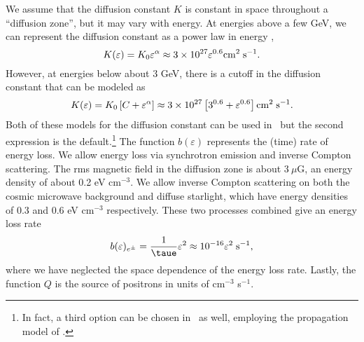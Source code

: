 We assume that the diffusion constant $K$ is constant in space throughout a
``diffusion zone'', but it may vary with energy.  At energies above a few GeV,
we can represent the diffusion constant as a power law in energy \cite{wlg},
\begin{equation}
   K(\varepsilon)=K_0\varepsilon^\alpha\approx
   3\times 10^{27}\varepsilon^{0.6}{\rm cm}^2\;{\rm s}^{-1}.
   \label{eq:KA}
\end{equation}
However, at energies below about 3 GeV, there is a cutoff in the diffusion
constant that can be modeled as
\begin{equation}
   K(\varepsilon)=K_0\left[C+\varepsilon^\alpha\right]\approx
   3\times 10^{27}\left[3^{0.6}+\varepsilon^{0.6}\right]
   {\rm cm}^2\;{\rm s}^{-1}.
   \label{eq:KB}
\end{equation}
Both of these models for the diffusion constant can be used in \ds\ but the
second expression is the default.\footnote{In fact, a third option can be
   chosen in \ds\ as well, employing the propagation model of \cite{kamturner}.}
The function $b(\varepsilon)$ represents the (time) rate of energy loss.  We
allow energy loss via synchrotron emission and inverse Compton scattering.  The
rms magnetic field in the diffusion zone is about $3~\mu$G, an energy density
of about 0.2 eV cm$^{-3}$\@. We allow inverse Compton scattering on both the
cosmic microwave background and diffuse starlight, which have energy densities
of 0.3 and 0.6 eV cm$^{-3}$ respectively.  These two processes combined give an
energy loss rate \cite{energy-loss} \def\erf{\mathop{\rm erf}}
\begin{equation}
   b(\varepsilon)_{e^\pm}=\frac{1}{\taue}\varepsilon^2
   \approx 10^{-16}\varepsilon^2\;{\rm s}^{-1},
   \label{eq:bofe}
\end{equation}
where we have neglected the space dependence of the energy loss rate.  Lastly,
the function $Q$ is the source of positrons in units of cm$^{-3}$ s$^{-1}$\@.

